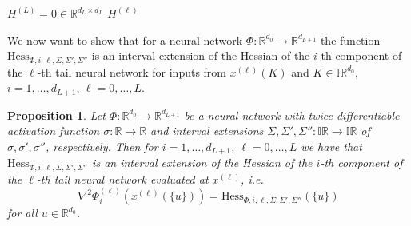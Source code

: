 \documentclass[a4paper, 11pt]{article}
\newtheorem{proposition}[theorem]{Proposition}
\begin{document}
	
	
	\vspace{1em}
	\begin{algorithm}[H]\label{alg: nn hess bounds}
		\LinesNotNumbered
		\DontPrintSemicolon
		\caption{$\mathrm{Hess}_{\Phi,i,\ell, \Sigma, \Sigma', \Sigma''}(K)$}
		\vspace{1em}
		$H^{(L)} = 0 \in \mathbb{R}^{d_L \times d_L}$\;
		\Return $H^{(\ell)}$\;
	\end{algorithm}
	\vspace{1em}
	
	We now want to show that for a neural network $\Phi : \mathbb{R}^{d_0} \to \mathbb{R}^{d_{L+1}}$ the function $\mathrm{Hess}_{\Phi,i,\ell, \Sigma, \Sigma', \Sigma''}$ is an interval extension of the Hessian of the $i$-th component of the $\ell$-th tail neural network for inputs from $x^{(\ell)}(K)$ and $K \in \mathbb{IR}^{d_0}$, $i=1, \dotsc, d_{L+1}$, $\ell = 0, \dotsc, L$.
	
	
	\begin{proposition}\label{prop: hess interval extension}
		Let $\Phi : \mathbb{R}^{d_0} \to \mathbb{R}^{d_{L+1}}$ be a neural network with twice differentiable activation function $\sigma : \mathbb{R} \to \mathbb{R}$ and interval extensions $\Sigma,\Sigma',\Sigma'':\mathbb{IR}\to \mathbb{IR}$ of $\sigma,\sigma',\sigma''$, respectively. Then for $i=1, \dotsc, d_{L+1}$, $\ell=0,\dotsc, L$ we have that $\mathrm{Hess}_{\Phi,i,\ell, \Sigma, \Sigma', \Sigma''}$ is an interval extension of the Hessian of the $i$-th component of the $\ell$-th tail neural network evaluated at $x^{(\ell)}$, i.e.
		$$ \nabla^2 \Phi_i^{(\ell)}(x^{(\ell)}(\{u\})) = \mathrm{Hess}_{\Phi,i,\ell, \Sigma, \Sigma', \Sigma''}(\{u\}) $$
		for all $u\in \mathbb{R}^{d_0}$.
	\end{proposition}
	
\end{document}
